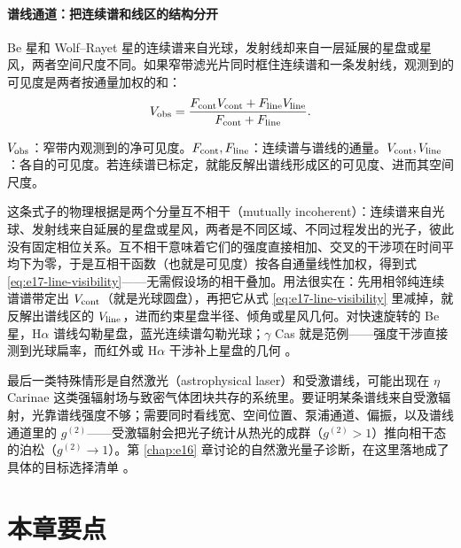 \paragraph{谱线通道：把连续谱和线区的结构分开}
\label{sec:e17-line}

Be 星和 Wolf--Rayet 星的连续谱来自光球，发射线却来自一层延展的星盘或星风，两者空间尺度不同。如果窄带滤光片同时框住连续谱和一条发射线，观测到的可见度是两者按通量加权的和：
\begin{equation}
  V_{\rm obs}=
  \frac{F_{\rm cont}V_{\rm cont}+F_{\rm line}V_{\rm line}}
       {F_{\rm cont}+F_{\rm line}} .
  \label{eq:e17-line-visibility}
\end{equation}
\begin{formulaexplain}
\(V_{\rm obs}\)：窄带内观测到的净可见度。\(F_{\rm cont},F_{\rm line}\)：连续谱与谱线的通量。\(V_{\rm cont},V_{\rm line}\)：各自的可见度。若连续谱已标定，就能反解出谱线形成区的可见度、进而其空间尺度。
\end{formulaexplain}
这条式子的物理根据是两个分量互不相干（mutually incoherent）：连续谱来自光球、发射线来自延展的星盘或星风，两者是不同区域、不同过程发出的光子，彼此没有固定相位关系。互不相干意味着它们的强度直接相加、交叉的干涉项在时间平均下为零，于是互相干函数（也就是可见度）按各自通量线性加权，得到式 \eqref{eq:e17-line-visibility}——无需假设场的相干叠加。用法很实在：先用相邻纯连续谱谱带定出 \(V_{\rm cont}\)（就是光球圆盘），再把它从式 \eqref{eq:e17-line-visibility} 里减掉，就反解出谱线区的 \(V_{\rm line}\)，进而约束星盘半径、倾角或星风几何。对快速旋转的 Be 星，H\(\alpha\) 谱线勾勒星盘，蓝光连续谱勾勒光球；\(\gamma\) Cas 就是范例——强度干涉直接测到光球扁率，而红外或 H\(\alpha\) 干涉补上星盘的几何 \citep{2025ApJ...995..191A}。

最后一类特殊情形是自然激光（astrophysical laser）和受激谱线，可能出现在 \(\eta\) Carinae 这类强辐射场与致密气体团块共存的系统里。要证明某条谱线来自受激辐射，光靠谱线强度不够；需要同时看线宽、空间位置、泵浦通道、偏振，以及谱线通道里的 \(g^{(2)}\)——受激辐射会把光子统计从热光的成群（\(g^{(2)}>1\)）推向相干态的泊松（\(g^{(2)}\to1\)）。第 \ref{chap:e16} 章讨论的自然激光量子诊断，在这里落地成了具体的目标选择清单 \citep{2004A&A...428..497J,2005NewA...10..361J,2008AIPC..984..216D}。

\section{本章要点}
\label{sec:e17-summary}

